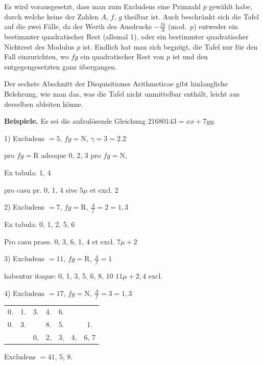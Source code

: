 \documentclass[10pt,a4paper]{article}
\begin{document}
Es wird vorausgesetzt, dass man zum Excludens eine Primzahl $p$ gew\"ahlt habe, durch welche keine der Zahlen $A$, $f$, $g$ theilbar ist. Auch beschr\"ankt sich die Tafel auf die zwei F\"alle, da der Werth des Ausdrucks $-\frac{fg}{A}$ (mod.~$p$) entweder ein bestimmter quadratischer Rest (allemal 1), oder ein bestimmter quadratischer Nichtrest des Modulus $p$ ist. Endlich hat man sich begn\"ugt, die Tafel nur f\"ur den Fall einzurichten, wo $fg$ ein quadratischer Rest von $p$ ist und den entgegengesetzten ganz \"ubergangen.

Der sechste Abschnitt der Disquisitiones Arithmeticae gibt hinlangliche Belehrung, wie man das, was die Tafel nicht unmittelbar enth\"alt, leicht aus derselben ableiten k\"onne.

\medskip

\textbf{Beispiele.} Es sei die aufzul\"osende Gleichung $21680143 = xx + 7yy$.

\medskip

1) Excludens $= 5$, $fg = \mathrm{N}$, $\gamma = 3 = 2.2$

pro $fg = \mathrm{R}$ adeoque 0, 2, 3 pro $fg = \mathrm{N}$,

Ex tabula: 1, 4

pro casu pr. 0, 1, 4 sive $5\mu$ et excl. 2

\medskip

2) Excludens $= 7$, $fg = \mathrm{R}$, $\frac{A}{f} = 2 = 1, 3$

Ex tabula: 0, 1, 2, 5, 6

Pro casu praes. 0, 3, 6, 1, 4 et excl. $7\mu + 2$

\medskip

3) Excludens $= 11$, $fg = \mathrm{R}$, $\frac{A}{f} = 1$

habentur itaque: 0, 1, 3, 5, 6, 8, 10 $11\mu + 2, 4$ excl.

\medskip

4) Excludens $= 17$, $fg = \mathrm{N}$, $\frac{A}{f} = 3 = 1, 3$

\begin{center}
\begin{tabular}{c c c c c c c}
0. & 1. & 3. & 4. & 6. & & \\
0. & 3. & & 8. & 5. & & 1. \\
& & 0, & 2, & 3, & 4, & 6, 7 \\
\end{tabular}
\end{center}

Excludens $= 41$, 5, 8.
\end{document}
